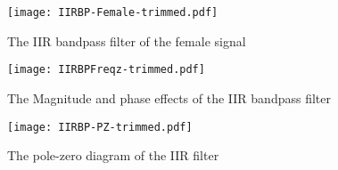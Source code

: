 \begin{figure}[h]
\centering
\texttt{[image: IIRBP-Female-trimmed.pdf]}
\caption{The IIR bandpass filter of the female signal}
\label{fig:IIRBP-female}
\end{figure}

\begin{figure}[h]
\centering
\texttt{[image: IIRBPFreqz-trimmed.pdf]}
\caption{The Magnitude and phase effects of the IIR bandpass filter}
\label{fig:IIRBPFreqz}
\end{figure}

\begin{figure}[h]
\centering
\texttt{[image: IIRBP-PZ-trimmed.pdf]}
\caption{The pole-zero diagram of the IIR filter}
\label{fig:IIRBP-PZ}
\end{figure}
